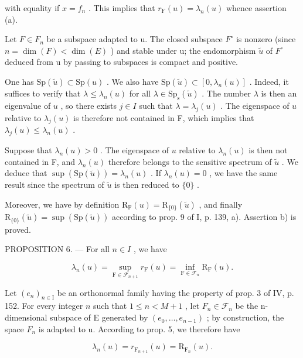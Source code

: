 with equality if \(x = f_{n}\) . This implies that \(r_{\mathrm{F}}(u) = \lambda_{n}(u)\) whence assertion (a).

Let \(F \in F_{n}\) be a subspace adapted to u. The closed subspace \(F^{\circ}\) is nonzero (since \(n = \dim(F) < \dim(E)\) ) and stable under u; the endomorphism \(\widetilde{u}\) of \(F^{\circ}\) deduced from u by passing to subspaces is compact and positive.

One has \(\mathrm{Sp}(\widetilde{u})\subset \mathrm{Sp}(u)\) . We also have \(\mathrm{Sp}(\widetilde{u})\subset [0,\lambda_n(u)]\) . Indeed, it suffices to verify that \(\lambda \leqslant \lambda_{n}(u)\) for all \(\lambda \in \mathrm{Sp}_{\mathrm{s}}(\widetilde{u})\) . The number \(\lambda\) is then an eigenvalue of \(u\) , so there exists \(j\in I\) such that \(\lambda = \lambda_j(u)\) . The eigenspace of \(u\) relative to \(\lambda_{j}(u)\) is therefore not contained in F, which implies that \(\lambda_{j}(u)\leqslant \lambda_{n}(u)\) .

Suppose that \(\lambda_n(u) > 0\) . The eigenspace of \(u\) relative to \(\lambda_n(u)\) is then not contained in F, and \(\lambda_n(u)\) therefore belongs to the sensitive spectrum of \(\widetilde{u}\) . We deduce that \(\sup (\mathrm{Sp}(\widetilde{u})) = \lambda_n(u)\) . If \(\lambda_n(u) = 0\) , we have the same result since the spectrum of \(\widetilde{u}\) is then reduced to \(\{0\}\) .

Moreover, we have by definition \(\mathrm{R}_{\mathrm{F}}(u)=\mathrm{R}_{\{0\}}(\widetilde{u})\) , and finally \(\mathrm{R}_{\{0\}}(\widetilde{u})=\sup(\mathrm{Sp}(\widetilde{u}))\) according to prop. 9 of I, p. 139, a). Assertion b) is proved.

PROPOSITION 6. --- For all \(n \in I\) , we have

\[
\lambda_ {n} (u) = \sup _ {\mathrm{F} \in \mathscr {F} _ {n + 1}} r _ {\mathrm{F}} (u) = \inf _ {\mathrm{F} \in \mathscr {F} _ {n}} \mathrm{R} _ {\mathrm{F}} (u).
\]

Let \((e_{n})_{n\in\mathrm{I}}\) be an orthonormal family having the property of prop. 3 of IV, p. 152. For every integer \(n\) such that \(1\leqslant n<M+1\) , let \(F_{n}\in\mathcal{F}_{n}\) be the n-dimensional subspace of E generated by \((e_{0},\ldots,e_{n-1})\) ; by construction, the space \(F_{n}\) is adapted to u. According to prop. 5, we therefore have

\[
\lambda_ {n} (u) = r _ {\mathrm{F} _ {n + 1}} (u) = \mathrm{R} _ {\mathrm{F} _ {n}} (u).\tag{2}
\]

